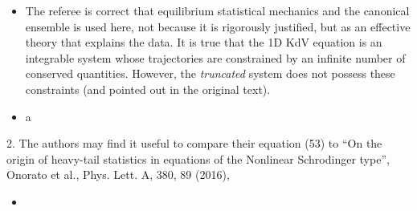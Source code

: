 \documentclass[11pt]{article}
\newcommand{\comment}[1]{{\color{blue} #1}}
\begin{document}
\begin{itemize}
\item The referee is correct that equilibrium statistical mechanics and the canonical ensemble is used here, not because it is rigorously justified, but as an effective theory that explains the data.
It is true that the 1D KdV equation is an integrable system whose trajectories are constrained by an infinite number of conserved quantities. However, the {\em truncated} system does not possess these constraints (and pointed out in the original text).
\item a
\end{itemize}

\noindent
\comment{
2. The authors may find it useful to compare their equation (53) to
 ``On the origin of heavy-tail statistics in equations of the Nonlinear Schrodinger type'', Onorato et al., Phys. Lett. A, 380, 89 (2016), 
}

\begin{itemize}
\item
\end{itemize}
\end{document}
